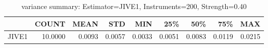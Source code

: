 \begin{table}[ht]
\centering
\caption{variance summary: Estimator=JIVE1, Instruments=200, Strength=0.40}
\begin{tabular}{lrrrrrrrr}
\toprule
 & COUNT & MEAN & STD & MIN & 25\% & 50\% & 75\% & MAX \\
\midrule
JIVE1 & 10.0000 & 0.0093 & 0.0057 & 0.0033 & 0.0051 & 0.0083 & 0.0119 & 0.0215 \\
\bottomrule
\end{tabular}
\end{table}
